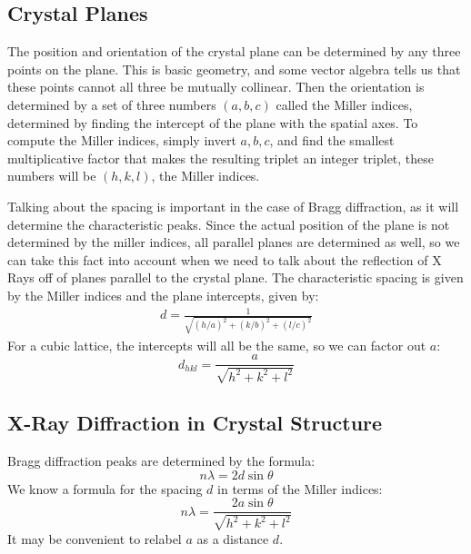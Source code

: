 \documentclass[letterpaper,12pt]{article}
\begin{document}
\subsection{Crystal Planes}
The position and orientation of the crystal plane can be determined by any three points on the plane. This is basic geometry, and some vector algebra tells us that these points cannot all three be mutually collinear. Then the orientation is determined by a set of three numbers $(a,b,c)$ called the Miller indices, determined by finding the intercept of the plane with the spatial axes. To compute the Miller indices, simply invert $a,b,c$, and find the smallest multiplicative factor that makes the resulting triplet an integer triplet, these numbers will be $(h,k,l)$, the Miller indices.

Talking about the spacing is important in the case of Bragg diffraction, as it will determine the characteristic peaks. Since the actual position of the plane is not determined by the miller indices, all parallel planes are determined as well, so we can take this fact into account when we need to talk about the reflection of X Rays off of planes parallel to the crystal plane. The characteristic spacing is given by the Miller indices and the plane intercepts, given by:
\begin{align}
  d=\frac{1}{\sqrt{(h/a)^2+(k/b)^2+(l/c)^2}}
\end{align}
For a cubic lattice, the intercepts will all be the same, so we can factor out $a$:
\begin{equation}
  d_{hkl}=\frac{a}{\sqrt{h^2+k^2+l^2}}
\end{equation}

\subsection{X-Ray Diffraction in Crystal Structure}
Bragg diffraction peaks are determined by the formula:
\begin{equation}
  n\lambda = 2d\sin\theta
\end{equation}
We know a formula for the spacing $d$ in terms of the Miller indices:
\begin{equation}
  n\lambda=\frac{2a\sin\theta}{\sqrt{h^2+k^2+l^2}}
\end{equation}
It may be convenient to relabel $a$ as a distance $d$.
\end{document}
